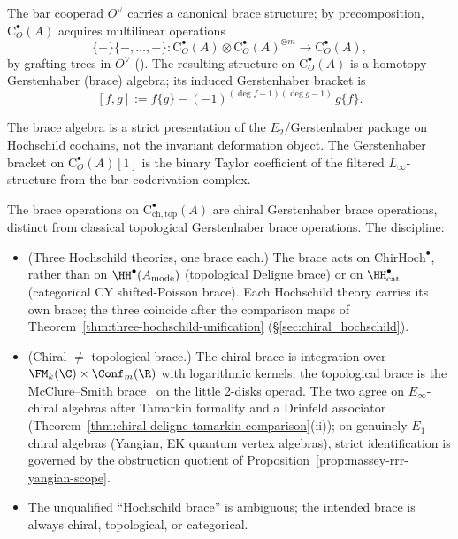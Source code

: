 \begin{definition}
\label{def:brace-ops-brace}
The bar cooperad $O^\vee$ carries a canonical brace structure; by precomposition,
$\mathrm{C}^\bullet_O(A)$ acquires multilinear operations
\[
\{-\}\{-,\ldots,-\}\colon \mathrm{C}^\bullet_O(A)\otimes \mathrm{C}^\bullet_O(A)^{\otimes m}\longrightarrow \mathrm{C}^\bullet_O(A),
\]
by grafting trees in $O^\vee$ (\cite{GJ94,Vor99}).
The resulting structure on $\mathrm{C}^\bullet_O(A)$ is a homotopy Gerstenhaber (brace) algebra; its induced Gerstenhaber bracket is
\[
[f,g] := f\{g\} - (-1)^{(\deg f-1)(\deg g-1)}\, g\{f\}.
\]
\end{definition}

\begin{remark}
\label{rem:brace-strict-coordinates}
The brace algebra is a strict presentation of the $E_2$/Gerstenhaber package on
Hochschild cochains, not the invariant deformation object. The Gerstenhaber bracket on
$\mathrm{C}^\bullet_O(A)[1]$ is the binary Taylor coefficient of the
filtered $L_\infty$-structure from the bar-coderivation complex.
\end{remark}

\begin{remark}%
\label{rem:brace-chiral-vs-topological-discipline}%
%
%
The brace operations on
$\mathrm{C}^\bullet_{\mathrm{ch,top}}(A)$ are
chiral Gerstenhaber brace operations, distinct from classical
topological Gerstenhaber brace operations. The discipline:
\begin{itemize}[nosep]
\item (Three Hochschild theories, one brace each.) The brace acts on
 $\mathrm{ChirHoch}^\bullet$, rather than on
 $\HH^\bullet(A_{\mathrm{mode}})$ (topological Deligne brace) or on
 $\HH^\bullet_{\mathrm{cat}}$ (categorical CY shifted-Poisson brace).
 Each Hochschild theory carries its own brace; the three coincide after the comparison maps of
 Theorem~\ref{thm:three-hochschild-unification} (\S\ref{sec:chiral_hochschild}).
\item (Chiral $\ne$ topological brace.) The chiral brace is
 integration over $\FM_k(\C) \times \Conf_m(\R)$
 with logarithmic kernels; the topological brace is the McClure--Smith
 brace~\cite{McClureSmith02} on the little 2-disks operad. The two agree on
 $E_\infty$-chiral algebras after Tamarkin formality and a Drinfeld
 associator (Theorem~\ref{thm:chiral-deligne-tamarkin-comparison}(ii));
 on genuinely $E_1$-chiral algebras (Yangian, EK quantum
 vertex algebras), strict identification is governed by the
 obstruction quotient of Proposition~\ref{prop:massey-rrr-yangian-scope}.
\item The unqualified ``Hochschild brace'' is ambiguous;
 the intended brace is always chiral, topological, or categorical.
\end{itemize}
\end{remark}

